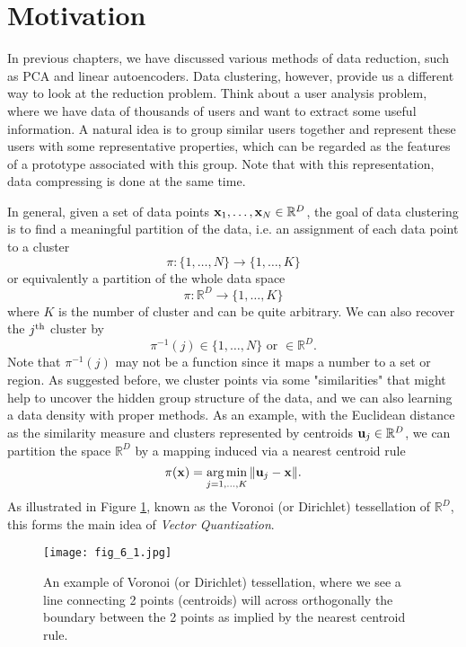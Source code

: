 \documentclass[../book-template.tex]{subfiles}
\begin{document}
\section{Motivation}
In previous chapters, we have discussed various methods of data reduction, such as PCA and linear autoencoders. Data clustering, however, provide us a different way to look at the reduction problem. Think about a user analysis problem, where we have data of thousands of users and want to extract some useful information. A natural idea is to group similar users together and represent these users with some representative properties, which can be regarded as the features of a prototype associated with this group. Note that with this representation, data compressing is done at the same time. 
\par In general, given a set of data points ${\bf x}_1,\dots, {\bf x}_N\in \mathbb{R}^D$, the goal of data clustering is to find a meaningful partition of the data, i.e. an assignment of each data point to a cluster
\begin{equation*}
	\pi : \{1,\dots,N\}\rightarrow \{1,\dots,K\}
\end{equation*}
or equivalently a partition of the whole data space
\begin{equation*}
	\pi: \mathbb{R}^{D}\rightarrow \{1,\dots,K\}
\end{equation*}
where $K$ is the number of cluster and can be quite arbitrary. We can also recover the $j^{\rm th}$ cluster by
\begin{equation*}
	\pi^{-1}(j)\in\{1,\dots,N\}\text{ or }\in \mathbb{R}^D.
\end{equation*}
Note that $\pi^{-1}(j)$ may not be a function since it maps a number to a set or region. As suggested before, we cluster points via some "similarities" that might help to uncover the hidden group structure of the data, and we can also learning a data density with proper methods. As an example, with the Euclidean distance as the similarity measure and clusters represented by centroids ${\bf u}_j\in\mathbb{R}^D$, we can partition the space $\mathbb{R}^D$ by a mapping induced via a nearest centroid rule
\begin{equation*}
	\pi({\bf x}) = \mathop{\arg\min}_{j=1,\dots,K}\|{\bf u}_j-{\bf x}\|.
\end{equation*}
As illustrated in Figure \ref{fig_6_1}, known as the Voronoi (or Dirichlet) tessellation of $\mathbb{R}^D$, this forms the main idea of \emph{Vector Quantization}.
\begin{figure}[h] 
	\centering 
	\texttt{[image: fig\_6\_1.jpg]} 
	\caption{An example of Voronoi (or Dirichlet) tessellation, where we see a line connecting 2 points (centroids) will across orthogonally the boundary between the 2 points as implied by the nearest centroid rule.}\label{fig_6_1}
\end{figure}
\end{document}
